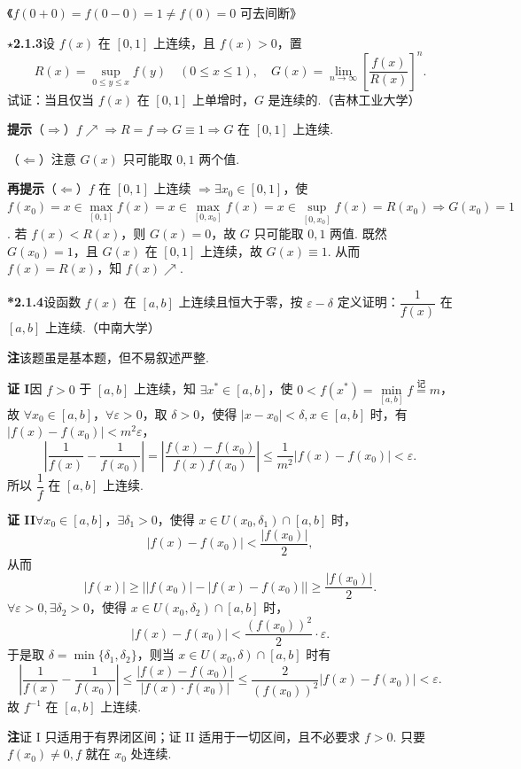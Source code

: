 \documentclass[UTF8, 12pt, fontset=fandol, oneside]{ctexart}
\begin{document}
《$f(0+0)=f(0-0)=1\ne f(0)=0$ 可去间断》

\noindent\textbf{$\star$2.1.3}\quad 设 $f(x)$ 在 $[0,1]$ 上连续，且 $f(x)>0$，置
\[
  R(x)=\sup_{0\le y\le x}f(y)\quad(0\le x\le1),\quad
  G(x)=\lim_{n\to\infty}\left[\frac{f(x)}{R(x)}\right]^n.
\]
试证：当且仅当 $f(x)$ 在 $[0,1]$ 上单增时，$G$ 是连续的.（吉林工业大学）

\noindent\textbf{提示}\quad （$\Rightarrow$）$f\nearrow\Rightarrow R=f\Rightarrow G\equiv1\Rightarrow G$ 在 $[0,1]$ 上连续.

（$\Leftarrow$）注意 $G(x)$ 只可能取 $0,1$ 两个值.

\noindent\textbf{再提示}\quad （$\Leftarrow$）$f$ 在 $[0,1]$ 上连续 $\Rightarrow \exists x_0\in[0,1]$，使 $f(x_0)=x\in\max\limits_{[0,1]}f(x)=x\in\max\limits_{[0,x_0]}f(x)=x\in\sup\limits_{[0,x_0]}f(x)=R(x_0)\Rightarrow G(x_0)=1$. 若 $f(x)<R(x)$，则 $G(x)=0$，故 $G$ 只可能取 $0,1$ 两值. 既然 $G(x_0)=1$，且 $G(x)$ 在 $[0,1]$ 上连续，故 $G(x)\equiv1$. 从而 $f(x)=R(x)$，知 $f(x)\nearrow$.

\noindent\textbf{*2.1.4}\quad 设函数 $f(x)$ 在 $[a,b]$ 上连续且恒大于零，按 $\varepsilon-\delta$ 定义证明：$\dfrac1{f(x)}$ 在 $[a,b]$ 上连续.（中南大学）

\noindent\textbf{注}\quad 该题虽是基本题，但不易叙述严整.

\noindent\textbf{证 I}\quad 因 $f>0$ 于 $[a,b]$ 上连续，知 $\exists x^*\in[a,b]$，使 $0<f(x^*)=\min\limits_{[a,b]}f\overset{\text{记}}=m$，故 $\forall x_0\in[a,b]$，$\forall\varepsilon>0$，取 $\delta>0$，使得 $|x-x_0|<\delta,x\in[a,b]$ 时，有 $|f(x)-f(x_0)|<m^2\varepsilon$，
\[
  \left|\frac1{f(x)}-\frac1{f(x_0)}\right|
  =\left|\frac{f(x)-f(x_0)}{f(x)f(x_0)}\right|
  \le\frac1{m^2}|f(x)-f(x_0)|<\varepsilon.
\]
所以 $\dfrac1f$ 在 $[a,b]$ 上连续.

\noindent\textbf{证 II}\quad $\forall x_0\in[a,b]$，$\exists\delta_1>0$，使得 $x\in U(x_0,\delta_1)\cap[a,b]$ 时，
\[
  |f(x)-f(x_0)|<\frac{|f(x_0)|}{2},
\]
从而
\[
  |f(x)|\ge\bigl||f(x_0)|-|f(x)-f(x_0)|\bigr|\ge \frac{|f(x_0)|}{2}.
\]
$\forall\varepsilon>0,\exists\delta_2>0$，使得 $x\in U(x_0,\delta_2)\cap[a,b]$ 时，
\[
  |f(x)-f(x_0)|<\frac{(f(x_0))^2}{2}\cdot\varepsilon.
\]
于是取 $\delta=\min\{\delta_1,\delta_2\}$，则当 $x\in U(x_0,\delta)\cap[a,b]$ 时有
\[
  \left|\frac1{f(x)}-\frac1{f(x_0)}\right|
  \le\frac{|f(x)-f(x_0)|}{|f(x)\cdot f(x_0)|}
  \le\frac2{(f(x_0))^2}|f(x)-f(x_0)|<\varepsilon.
\]
故 $f^{-1}$ 在 $[a,b]$ 上连续.

\noindent\textbf{注}\quad 证 I 只适用于有界闭区间；证 II 适用于一切区间，且不必要求 $f>0$. 只要 $f(x_0)\ne0,f$ 就在 $x_0$ 处连续.
\end{document}
